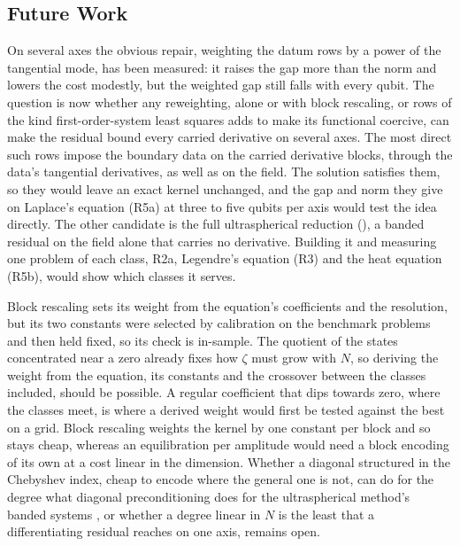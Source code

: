 \subsection{Future Work}
\label{sec:future-work}

On several axes the obvious repair, weighting the datum rows by a power of the tangential mode, has been measured: it raises the gap more than the norm and lowers the cost modestly, but the weighted gap still falls with every qubit. The question is now whether any reweighting, alone or with block rescaling, or rows of the kind first-order-system least squares adds to make its functional coercive, can make the residual bound every carried derivative on several axes. The most direct such rows impose the boundary data on the carried derivative blocks, through the data's tangential derivatives, as well as on the field. The solution satisfies them, so they would leave an exact kernel unchanged, and the gap and norm they give on Laplace's equation (R5a) at three to five qubits per axis would test the idea directly. The other candidate is the full ultraspherical reduction (), a banded residual on the field alone that carries no derivative. Building it and measuring one problem of each class, R2a, Legendre's equation (R3) and the heat equation (R5b), would show which classes it serves.

Block rescaling sets its weight from the equation's coefficients and the resolution, but its two constants were selected by calibration on the benchmark problems and then held fixed, so its check is in-sample. The quotient of the states concentrated near a zero already fixes how $\zeta$ must grow with $N$, so deriving the weight from the equation, its constants and the crossover between the classes included, should be possible. A regular coefficient that dips towards zero, where the classes meet, is where a derived weight would first be tested against the best on a grid. Block rescaling weights the kernel by one constant per block and so stays cheap, whereas an equilibration per amplitude would need a block encoding of its own at a cost linear in the dimension. Whether a diagonal structured in the Chebyshev index, cheap to encode where the general one is not, can do for the degree what diagonal preconditioning does for the ultraspherical method's banded systems \cite{olver2013}, or whether a degree linear in $N$ is the least that a differentiating residual reaches on one axis, remains open.

